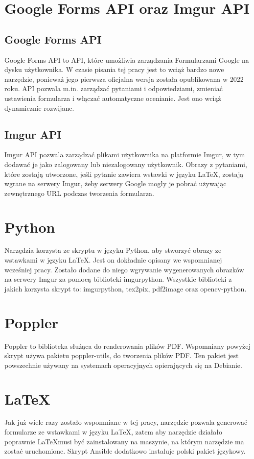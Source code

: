\section{Google Forms API oraz Imgur API}

\subsection*{Google Forms API}
Google Forms API to API, które umożliwia zarządzania Formularzami Google na dysku
użytkownika. W czasie pisania tej pracy jest to wciąż bardzo nowe narzędzie, ponieważ
jego pierwsza oficjalna wersja została opublikowana w 2022 roku. API pozwala m.in. zarządzać
pytaniami i odpowiedziami, zmieniać ustawienia formularza i włączać automatyczne ocenianie.
Jest ono wciąż dynamicznie rozwijane.

\subsection*{Imgur API}
Imgur API pozwala zarządzać plikami użytkownika na platformie Imgur, w tym dodawać je jako
zalogowany lub niezalogowany użytkownik. Obrazy z pytaniami, które zostają utworzone, jeśli
pytanie zawiera wstawki w języku \LaTeX, zostają wgrane na serwery Imgur, żeby serwery Google
mogły je pobrać używając zewnętrznego URL podczas tworzenia formularza.

\section{Python}
Narzędzia korzysta ze skryptu w języku Python, aby stworzyć obrazy ze wstawkami w języku \LaTeX.
Jest on dokładnie opisany we wspomnianej wcześniej pracy. Zostało dodane do niego wgrywanie 
wygenerowanych obrazków na serwery Imgur za pomocą biblioteki imgurpython.
Wszystkie biblioteki z jakich korzysta skrypt to: imgurpython, tex2pix, pdf2image oraz
opencv-python.

\section{Poppler}
Poppler to biblioteka służąca do renderowania plików PDF. Wspomniany powyżej skrypt
używa pakietu poppler-utils, do tworzenia plików PDF. Ten pakiet jest powszechnie
używany na systemach operacyjnych opierających się na Debianie.

\section{LaTeX}
Jak już wiele razy zostało wspomniane w tej pracy, narzędzie pozwala generować formularze ze 
wstawkami
w języku \LaTeX, zatem aby narzędzie działało poprawnie \LaTeX musi być zainstalowany 
na maszynie, na którym narzędzie ma zostać uruchomione. Skrypt Ansible dodatkowo instaluje
polski pakiet językowy.
